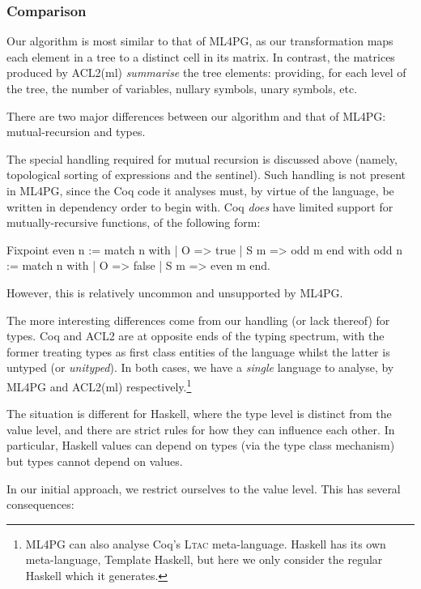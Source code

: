 \subsubsection{Comparison}

Our algorithm is most similar to that of ML4PG, as our transformation maps each element in a tree to a distinct cell in its matrix. In contrast, the matrices produced by ACL2(ml) \emph{summarise} the tree elements: providing, for each level of the tree, the number of variables, nullary symbols, unary symbols, etc.

There are two major differences between our algorithm and that of ML4PG: mutual-recursion and types.

The special handling required for mutual recursion is discussed above (namely, topological sorting of expressions and the  sentinel). Such handling is not present in ML4PG, since the Coq code it analyses must, by virtue of the language, be written in dependency order to begin with. Coq \emph{does} have limited support for mutually-recursive functions, of the following form:

\begin{coqblock}
Fixpoint even n := match n with
                       | O   => true
                       | S m => odd m
                   end
    with odd  n := match n with
                       | O   => false
                       | S m => even m
                   end.
\end{coqblock}

However, this is relatively uncommon and unsupported by ML4PG.

The more interesting differences come from our handling (or lack thereof) for types. Coq and ACL2 are at opposite ends of the typing spectrum, with the former treating types as first class entities of the language whilst the latter is untyped (or \emph{unityped}). In both cases, we have a \emph{single} language to analyse, by ML4PG and ACL2(ml) respectively.\footnote{ML4PG can also analyse Coq's \textsc{Ltac} meta-language. Haskell has its own meta-language, Template Haskell, but here we only consider the regular Haskell which it generates.}

The situation is different for Haskell, where the type level is distinct from the value level, and there are strict rules for how they can influence each other. In particular, Haskell values can depend on types (via the type class mechanism) but types cannot depend on values.

In our initial approach, we restrict ourselves to the value level. This has several consequences:


